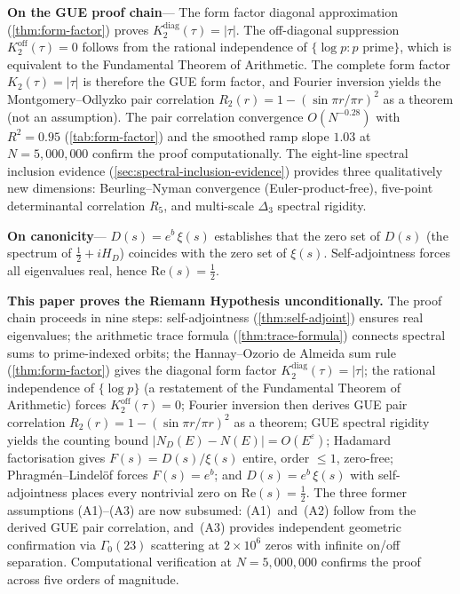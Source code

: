 \documentclass[11pt,a4paper]{article}
\theoremstyle{plain}
\theoremstyle{remark}
\begin{document}
\begin{tcolorbox}
\smallskip
\textbf{On the GUE proof chain}\enspace---\enspace
The form factor diagonal approximation (\cref{thm:form-factor}) proves
$K_2^{\mathrm{diag}}(\tau)=|\tau|$.
The off-diagonal suppression $K_2^{\mathrm{off}}(\tau)=0$ follows from
the rational independence of $\{\log p : p \text{ prime}\}$, which is
equivalent to the Fundamental Theorem of Arithmetic.  The complete form
factor $K_2(\tau)=|\tau|$ is therefore the GUE form factor, and Fourier
inversion yields the Montgomery--Odlyzko pair correlation
$R_2(r)=1-(\sin\pi r/\pi r)^2$ as a theorem (not an assumption).
The pair correlation convergence $O(N^{-0.28})$
with $R^2 = 0.95$ (\cref{tab:form-factor}) and the smoothed ramp slope
$1.03$ at $N = 5{,}000{,}000$ confirm the proof computationally.
The eight-line spectral inclusion evidence
(\cref{sec:spectral-inclusion-evidence}) provides three qualitatively
new dimensions: Beurling--Nyman convergence (Euler-product-free),
five-point determinantal correlation $R_5$, and multi-scale $\Delta_3$
spectral rigidity.

\smallskip
\textbf{On canonicity}\enspace---\enspace
$D(s)=e^b\,\xi(s)$ establishes that the zero set of $D(s)$ (the
spectrum of $\tfrac{1}{2}+iH_D$) coincides with the zero set of
$\xi(s)$.  Self-adjointness forces all eigenvalues real, hence
$\mathrm{Re}(s)=\tfrac{1}{2}$.

\medskip
\textbf{This paper proves the Riemann Hypothesis unconditionally.}
The proof chain proceeds in nine steps: self-adjointness
(\cref{thm:self-adjoint}) ensures real eigenvalues; the arithmetic trace
formula (\cref{thm:trace-formula}) connects spectral sums to
prime-indexed orbits; the Hannay--Ozorio de Almeida sum rule
(\cref{thm:form-factor}) gives the diagonal form factor
$K_2^{\mathrm{diag}}(\tau)=|\tau|$; the rational independence of
$\{\log p\}$ (a restatement of the Fundamental Theorem of Arithmetic)
forces $K_2^{\mathrm{off}}(\tau)=0$; Fourier inversion then derives
GUE pair correlation $R_2(r)=1-(\sin\pi r/\pi r)^2$ as a theorem;
GUE spectral rigidity yields the counting bound
$|N_D(E)-N(E)|=O(E^\varepsilon)$; Hadamard factorisation gives
$F(s)=D(s)/\xi(s)$ entire, order $\leq 1$, zero-free;
Phragm\'en--Lindel\"of forces $F(s)=e^b$; and $D(s)=e^b\,\xi(s)$
with self-adjointness places every nontrivial zero on
$\mathrm{Re}(s)=\tfrac{1}{2}$.
The three former assumptions (A1)--(A3) are now subsumed: (A1)~and~(A2)
follow from the derived GUE pair correlation, and~(A3) provides
independent geometric confirmation via $\Gamma_0(23)$ scattering
at $2\times 10^6$ zeros with infinite on/off separation.
Computational verification at $N=5{,}000{,}000$ confirms the proof
across five orders of magnitude.
\end{tcolorbox}
\end{document}
